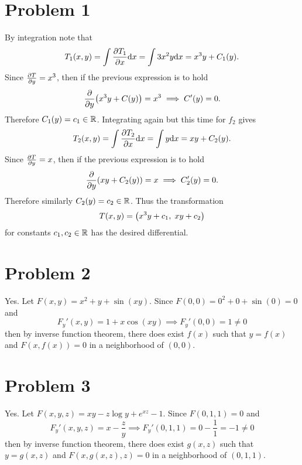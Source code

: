\documentclass{eeleyes}
\begin{document}
\section*{Problem 1}
By integration note that
\[
    T_1(x,y) = \int \pdv{T_1}{x} \dd x = \int 3x^2 y \dd x = x^3 y + C_1(y)
.\]
Since $\pdv{T}{y} = x^3$, then if the previous expression is to hold
\[
    \pdv{y} (x^3 y + C(y)) = x^3 \implies C'(y) = 0
.\]
Therefore $C_1(y) = c_1 \in \mathbb{R}$. Integrating again but this time for $f_2$ gives
\[
    T_2(x,y) = \int \pdv{T_2}{x} \dd x = \int y \dd x = xy + C_2(y)
.\]
Since $\pdv{T}{y} = x$, then if the previous expression is to hold
\[
    \pdv{y} (xy + C_2(y)) = x \implies C_2'(y) = 0
.\]
Therefore similarly $C_2(y) = c_2 \in \mathbb{R}$. Thus the transformation
\[
    T(x,y) = \qty(x^3 y + c_1 ,\; xy + c_2)
\]
for constants $c_1, c_2 \in \mathbb{R}$ has the desired differential.

\section*{Problem 2}
Yes. Let $F(x,y) = x^2 + y + \sin(xy)$. Since $F(0,0) = 0^2 + 0 + \sin(0) = 0$ and 
\[
    F_y'(x,y) = 1 + x \cos(xy) \implies F_y'(0,0) = 1 \neq 0
\]
then by inverse function theorem, there does exist $f(x)$ such that $y = f(x)$ and $F(x, f(x)) = 0$ in a neighborhood of $(0,0)$.

\section*{Problem 3}
Yes. Let $F(x,y,z) = xy - z \log y + e^{xz} - 1$. Since $F(0,1,1) = 0$ and
\[
    F_y'(x,y,z) = x - \frac{z}{y} \implies F_y'(0,1,1) = 0 - \frac{1}{1} = -1 \neq 0
\]
then by inverse function theorem, there does exist $g(x,z)$ such that $y = g(x,z)$ and $F(x, g(x,z), z) = 0$ in a neighborhood of $(0, 1, 1)$.
\end{document}
